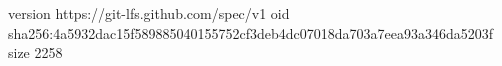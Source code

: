 version https://git-lfs.github.com/spec/v1
oid sha256:4a5932dac15f589885040155752cf3deb4dc07018da703a7eea93a346da5203f
size 2258
